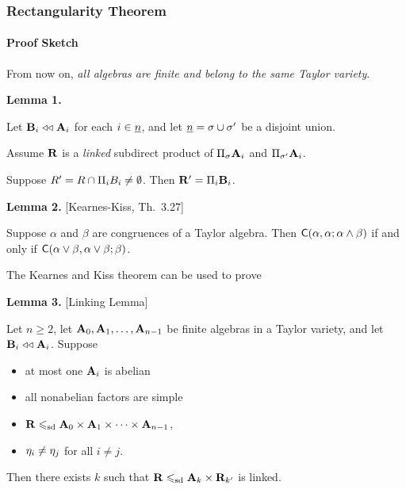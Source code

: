 \documentclass[xcolor=dvipsnames,9pt,hide notes,mathserif]{beamer}
\renewcommand{\alert}[1]{\textcolor{olivegreen}{#1}}
\renewcommand{\emph}[1]{\alert{{\it #1}}}
\begin{document}
\begin{frame} \frametitle{Rectangularity Theorem}
  \framesubtitle{Proof Sketch}
  From now on,
    \emph{all algebras are finite and belong to the same Taylor variety}.

    {\bf Lemma 1.}
      
    Let $\mathbf{B}_i\mathrel{\triangleleft\triangleleft} \mathbf{A}_i$ for each $i\in \underline{n} $, 
    and let $\underline{n}  = \sigma \cup {\sigma'}$ be a disjoint union.
    
    Assume $\mathbf{R}$ is a \emph{linked} subdirect product of 
    $\Pi_{\sigma} \mathbf{A}_i$ and $\Pi_{\sigma'}\mathbf{A}_i$.
    
    Suppose $R' = R \cap \Pi_i B_i \neq \emptyset$.    Then $\mathbf{R}' = \Pi_i \mathbf{B}_i$.

    \bigskip

    {\bf Lemma 2.} [Kearnes-Kiss, Th.~3.27]
    
    Suppose $\alpha$ and $\beta$ are congruences of a Taylor algebra. Then
    $\mathsf{C}(\alpha, \alpha; \alpha \wedge \beta)$ if and only if
    $\mathsf{C}(\alpha \vee \beta, \alpha \vee \beta; \beta)$.

    \medskip
    The Kearnes and Kiss theorem can be used to prove
    \medskip


    {\bf Lemma 3.} [Linking Lemma]
    
    Let $n\geq 2$, let $\mathbf{A}_0, \mathbf{A}_1, \dots, \mathbf{A}_{n-1}$ be finite algebras in a
    Taylor variety, and let $\mathbf{B}_i \mathrel{\triangleleft\triangleleft} \mathbf{A}_i$. Suppose
    \begin{itemize}
    \item at most one $\mathbf{A}_i$ is abelian
    \item all nonabelian factors are simple
    \item $\mathbf{R} \leqslant_{\mathrm{sd}} \mathbf{A}_0 \times \mathbf{A}_1 \times \cdots \times \mathbf{A}_{n-1}$,
    \item $\eta_i \neq \eta_j$ for all $i\neq j$.
    \end{itemize}
    Then there exists $k$ such that $\mathbf{R}\leqslant_{\mathrm{sd}} \mathbf{A}_k \times \mathbf{R}_{k'}$ is linked.


\end{frame}
\end{document}
